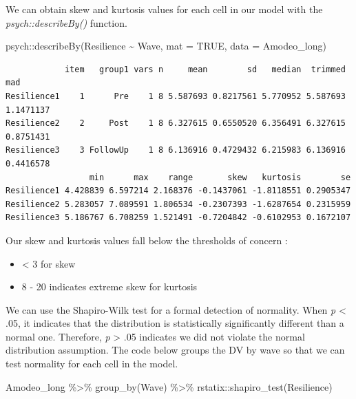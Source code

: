 \documentclass[
  11pt,
]{book}
\newenvironment{Shaded}{\begin{snugshade}}{\end{snugshade}}
\newcommand{\AttributeTok}[1]{\textcolor[rgb]{0.77,0.63,0.00}{#1}}
\newcommand{\ConstantTok}[1]{\textcolor[rgb]{0.00,0.00,0.00}{#1}}
\newcommand{\FunctionTok}[1]{\textcolor[rgb]{0.00,0.00,0.00}{#1}}
\newcommand{\NormalTok}[1]{#1}
\newcommand{\SpecialCharTok}[1]{\textcolor[rgb]{0.00,0.00,0.00}{#1}}
\providecommand{\tightlist}{%
  \setlength{\itemsep}{0pt}\setlength{\parskip}{0pt}}
\begin{document}
We can obtain skew and kurtosis values for each cell in our model with the \emph{psych::describeBy()} function.

\begin{Shaded}
\begin{Highlighting}[]
\NormalTok{psych}\SpecialCharTok{::}\FunctionTok{describeBy}\NormalTok{(Resilience }\SpecialCharTok{\textasciitilde{}}\NormalTok{ Wave, }\AttributeTok{mat =} \ConstantTok{TRUE}\NormalTok{, }\AttributeTok{data =}\NormalTok{ Amodeo\_long)}
\end{Highlighting}
\end{Shaded}

\begin{verbatim}
            item   group1 vars n     mean        sd   median  trimmed       mad
Resilience1    1      Pre    1 8 5.587693 0.8217561 5.770952 5.587693 1.1471137
Resilience2    2     Post    1 8 6.327615 0.6550520 6.356491 6.327615 0.8751431
Resilience3    3 FollowUp    1 8 6.136916 0.4729432 6.215983 6.136916 0.4416578
                 min      max    range       skew   kurtosis        se
Resilience1 4.428839 6.597214 2.168376 -0.1437061 -1.8118551 0.2905347
Resilience2 5.283057 7.089591 1.806534 -0.2307393 -1.6287654 0.2315959
Resilience3 5.186767 6.708259 1.521491 -0.7204842 -0.6102953 0.1672107
\end{verbatim}

Our skew and kurtosis values fall below the thresholds of concern \citep{kline_principles_2016}:

\begin{itemize}
\tightlist
\item
  \textless{} 3 for skew
\item
  8 - 20 indicates extreme skew for kurtosis
\end{itemize}

We can use the Shapiro-Wilk test for a formal detection of normality. When \emph{p} \textless{} .05, it indicates that the distribution is statistically significantly different than a normal one. Therefore, \emph{p} \textgreater{} .05 indicates we did not violate the normal distribution assumption. The code below groups the DV by wave so that we can test normality for each cell in the model.

\begin{Shaded}
\begin{Highlighting}[]
\NormalTok{Amodeo\_long }\SpecialCharTok{\%\textgreater{}\%}
  \FunctionTok{group\_by}\NormalTok{(Wave) }\SpecialCharTok{\%\textgreater{}\%}
\NormalTok{  rstatix}\SpecialCharTok{::}\FunctionTok{shapiro\_test}\NormalTok{(Resilience)}
\end{Highlighting}
\end{Shaded}
\end{document}
